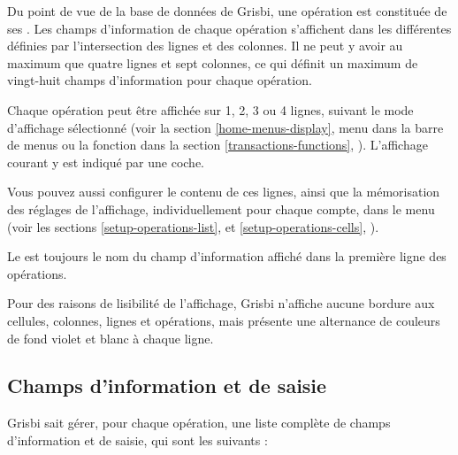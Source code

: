 Du point de vue de la base de données de Grisbi, une opération est constituée de ses . Les champs d'information de chaque opération s'affichent dans les différentes  définies par l'intersection des lignes et des colonnes. Il ne peut y avoir au  maximum que quatre lignes et sept colonnes, ce qui définit un maximum de vingt-huit champs d'information pour chaque opération.

Chaque opération peut être affichée sur 1, 2, 3 ou 4 lignes, suivant le mode d'affichage sélectionné (voir la section \vref{home-menus-display}, menu  dans la barre de menus ou la fonction  dans la section \vref{transactions-functions}, ). L'affichage courant y est indiqué par une coche. 

Vous pouvez aussi configurer le contenu de ces lignes, ainsi que la mémorisation des réglages de l'affichage, individuellement pour chaque compte, dans le menu  (voir les sections \vref{setup-operations-list},  et \vref{setup-operations-cells}, ).

Le  est toujours le nom du champ d'information  affiché dans la première ligne des opérations.

Pour des raisons de lisibilité de l'affichage, Grisbi n'affiche aucune bordure aux cellules, colonnes, lignes et opérations, mais présente une alternance de couleurs de fond violet et blanc{\couleurs} à chaque ligne.


\subsection{Champs d'information et de saisie\label{transactions-list-fields}}

Grisbi sait gérer, pour chaque opération, une liste complète de champs d'information et de saisie, qui sont les suivants :

